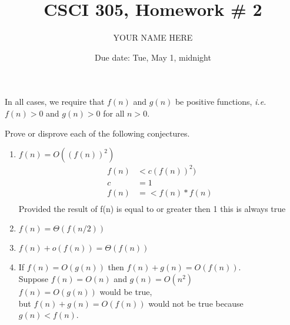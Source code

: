 \documentclass{article}
\title{CSCI 305, Homework \# 2}
\author{YOUR NAME HERE}
\date{Due date:  Tue, May 1, midnight}
\begin{document}
  
  \maketitle
  
  In all cases,
  we require that $f(n)$ and $g(n)$ be positive functions,
  {\em i.e.} $f(n) > 0$ and $g(n) > 0$ for all $n > 0$.
  
  Prove or disprove each of the following conjectures.
  
  
  \begin{enumerate}
  \item
    $f(n) = O((f(n))^2)$
    \begin{align*}
    f(n) &< c(f(n))^2) \\
    c &= 1 \\
    f(n) &=< f(n) * f(n) \\
    \end{align*}
  Provided the result of f(n) is equal to or greater then 1 this is always true
  \item
    $f(n) = \Theta(f(n/2))$
  \item
    $f(n) + o(f(n)) = \Theta(f(n))$
  
  \item
    If $f(n) = O(g(n))$ then $f(n) + g(n) = O(f(n))$.\\
    Suppose $f(n) = O(n)$ and $g(n) =O(n^2)$\\
    $f(n)= O(g(n))$ would be true,\\
    but $f(n) + g(n) =O(f(n))$ would not be true because $g(n) < f(n)$.
  \end{enumerate}
  
  
\end{document}
